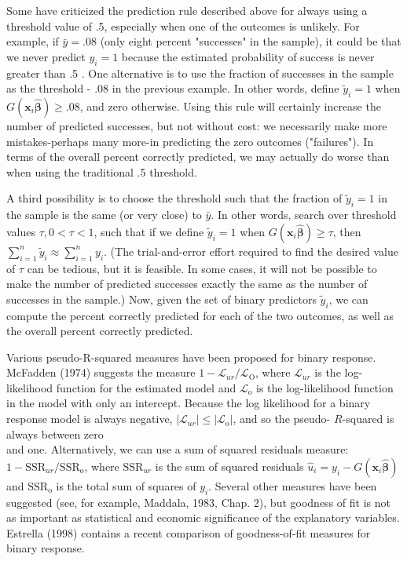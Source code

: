 \documentclass[10pt]{article}
\begin{document}
Some have criticized the prediction rule described above for always using a threshold value of .5, especially when one of the outcomes is unlikely. For example, if $\bar{y}=.08$ (only eight percent "successes" in the sample), it could be that we never predict $y_{i}=1$ because the estimated probability of success is never greater than .5 . One alternative is to use the fraction of successes in the sample as the threshold - .08 in the previous example. In other words, define $\tilde{y}_{i}=1$ when $G\left(\mathbf{x}_{i} \hat{\boldsymbol{\beta}}\right) \geq .08$, and zero otherwise. Using this rule will certainly increase the number of predicted successes, but not without cost: we necessarily make more mistakes-perhaps many more-in predicting the zero outcomes ("failures"). In terms of the overall percent correctly predicted, we may actually do worse than when using the traditional .5 threshold.

A third possibility is to choose the threshold such that the fraction of $\tilde{y}_{i}=1$ in the sample is the same (or very close) to $\bar{y}$. In other words, search over threshold values $\tau, 0<\tau<1$, such that if we define $\tilde{y}_{i}=1$ when $G\left(\mathbf{x}_{i} \hat{\boldsymbol{\beta}}\right) \geq \tau$, then $\sum_{i=1}^{n} \tilde{y}_{i} \approx \sum_{i=1}^{n} y_{i}$. (The trial-and-error effort required to find the desired value of $\tau$ can be tedious, but it is feasible. In some cases, it will not be possible to make the number of predicted successes exactly the same as the number of successes in the sample.) Now, given the set of binary predictors $\tilde{y}_{i}$, we can compute the percent correctly predicted for each of the two outcomes, as well as the overall percent correctly predicted.

Various pseudo-R-squared measures have been proposed for binary response. McFadden (1974) suggests the measure $1-\mathscr{L}_{u r} / \mathscr{L}_{\mathrm{O}}$, where $\mathscr{L}_{u r}$ is the log-likelihood function for the estimated model and $\mathscr{L}_{\mathrm{o}}$ is the log-likelihood function in the model with only an intercept. Because the log likelihood for a binary response model is always negative, $\left|\mathscr{L}_{u r}\right| \leq\left|\mathscr{L}_{\mathrm{o}}\right|$, and so the pseudo- $R$-squared is always between zero\\
and one. Alternatively, we can use a sum of squared residuals measure: $1-\mathrm{SSR}_{u r} / \mathrm{SSR}_{\mathrm{o}}$, where $\mathrm{SSR}_{u r}$ is the sum of squared residuals $\hat{u}_{i}=y_{i}-G\left(\mathbf{x}_{i} \hat{\boldsymbol{\beta}}\right)$ and $\mathrm{SSR}_{\mathrm{o}}$ is the total sum of squares of $y_{i}$. Several other measures have been suggested (see, for example, Maddala, 1983, Chap. 2), but goodness of fit is not as important as statistical and economic significance of the explanatory variables. Estrella (1998) contains a recent comparison of goodness-of-fit measures for binary response.
\end{document}
